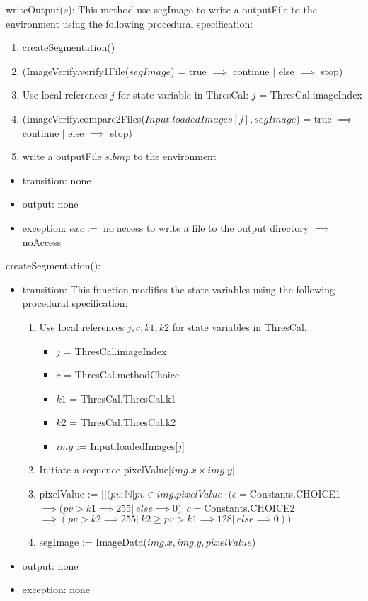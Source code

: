 \documentclass[12pt, titlepage]{article}
\begin{document}
\noindent writeOutput($s$):
This method use segImage to write a outputFile to the environment using the
following procedural specification:
\begin{enumerate}
    \item createSegmentation()
    \item
(ImageVerify.verify1File($segImage$) = true $\implies$ continue $|$ else
$\implies$ stop)
    \item
Use local references $j$ for state variable in ThresCal: $j$ =
ThresCal.imageIndex
    \item
(ImageVerify.compare2Files($Input.loadedImages[j],segImage$) = true $\implies$
continue $|$ else $\implies$ stop)
    \item write a outputFile $s.bmp$ to the environment
\end{enumerate}
\begin{itemize}
\item transition: none
\item output: none
\item exception: $exc := $ no access to write a file to the output directory
$\implies$ noAccess
\end{itemize}

\noindent createSegmentation():
\begin{itemize}
\item transition:
This function modifies the state variables using the following procedural
specification:
\begin{enumerate}
    \item
    Use local references $j, c, k1, k2$ for state variables in ThresCal.
    \begin{itemize}
        \item $j$ = ThresCal.imageIndex
        \item $c$ = ThresCal.methodChoice
        \item $k1$ = ThresCal.ThresCal.k1
        \item $k2$ = ThresCal.ThresCal.k2
        \item $img$ := Input.loadedImages[$j$]
    \end{itemize}
    \item
    Initiate a sequence pixelValue[$img.x \times img.y$]
    \item
pixelValue := $|| (pv: \mathbb{N} | pv \in img.pixelValue \cdot (c =
$Constants.CHOICE1$ \implies (pv > k1 \implies 255 |\ else \implies 0) |\ c =
$Constants.CHOICE2$ \implies (pv > k2 \implies 255 |\ k2 \ge pv > k1 \implies
128 |\ else \implies 0))$
    \item
    segImage := ImageData($img.x,img.y,pixelValue$)
\end{enumerate}
\item output: none
\item exception: none
\end{itemize}
\end{document}

